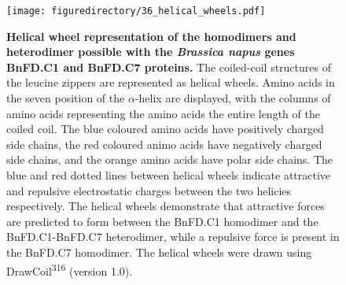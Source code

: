\documentclass[12pt,]{book}
\begin{document}
\begin{figure}[htbp]
\centering
\texttt{[image: figuredirectory/36\_helical\_wheels.pdf]}
\caption{\textbf{Helical wheel representation of the homodimers and
heterodimer possible with the \emph{Brassica napus} genes BnFD.C1 and
BnFD.C7 proteins.} The coiled-coil structures of the leucine zippers are
represented as helical wheels. Amino acids in the seven position of the
\(\alpha\)-helix are displayed, with the columns of amino acids
representing the amino acids the entire length of the coiled coil. The
blue coloured amino acids have positively charged side chains, the red
coloured animo acids have negatively charged side chains, and the orange
amino acids have polar side chains. The blue and red dotted lines
between helical wheels indicate attractive and repulsive electrostatic
charges between the two helicies respectively. The helical wheels
demonstrate that attractive forces are predicted to form between the
BnFD.C1 homodimer and the BnFD.C1-BnFD.C7 heterodimer, while a repulsive
force is present in the BnFD.C7 homodimer. The helical wheels were drawn
using DrawCoil\textsuperscript{316} (version
1.0).}\label{figure:236b:helicalwheels}
\end{figure}
\end{document}
